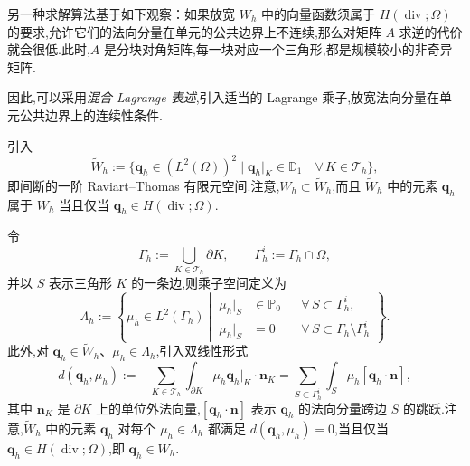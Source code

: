 另一种求解算法基于如下观察：如果放宽 \(W_h\) 中的向量函数须属于 \(H(\operatorname{div};\Omega)\) 的要求,允许它们的法向分量在单元的公共边界上不连续,那么对矩阵 \(A\) 求逆的代价就会很低.此时,\(A\) 是分块对角矩阵,每一块对应一个三角形,都是规模较小的非奇异矩阵.

因此,可以采用\emph{混合 Lagrange 表述},引入适当的 Lagrange 乘子,放宽法向分量在单元公共边界上的连续性条件.

\begin{example}\label{ex:7.3-discontinuous}
引入
\begin{equation}\label{eq:7.3.7}
  \widetilde W_h:=\{\boldsymbol{q}_h\in(L^2(\Omega))^2\mid
     \boldsymbol{q}_h|_K\in\mathbb D_1\quad\forall\,K\in\mathcal T_h\},
\end{equation}
即间断的一阶 Raviart--Thomas 有限元空间.注意,\(W_h\subset\widetilde W_h\),而且 \(\widetilde W_h\) 中的元素 \(\boldsymbol{q}_h\) 属于 \(W_h\) 当且仅当 \(\boldsymbol{q}_h\in H(\operatorname{div};\Omega)\).

令
\begin{equation}\label{eq:7.3.8}
  \Gamma_h:=\bigcup_{K\in\mathcal T_h}\partial K,\qquad
  \Gamma_h^i:=\Gamma_h\cap\Omega,
\end{equation}
并以 \(S\) 表示三角形 \(K\) 的一条边,则乘子空间定义为
\begin{equation}\label{eq:7.3.9}
  \Lambda_h:=\left\{\mu_h\in L^2(\Gamma_h)\ \left|\
    \begin{aligned}
      \mu_h|_S&\in\mathbb P_0&&\forall\,S\subset\Gamma_h^i,\\
      \mu_h|_S&=0&&\forall\,S\subset\Gamma_h\setminus\Gamma_h^i
    \end{aligned}
  \right.\right\}.
\end{equation}
此外,对 \(\boldsymbol{q}_h\in\widetilde W_h\)、\(\mu_h\in\Lambda_h\),引入双线性形式
\begin{equation}\label{eq:7.3.10}
  d(\boldsymbol{q}_h,\mu_h):=-\sum_{K\in\mathcal T_h}\int_{\partial K}\mu_h\boldsymbol{q}_h|_K\cdot\boldsymbol{n}_K
     =\sum_{S\subset\Gamma_h^i}\int_S\mu_h[\boldsymbol{q}_h\cdot\boldsymbol{n}],
\end{equation}
其中 \(\boldsymbol{n}_K\) 是 \(\partial K\) 上的单位外法向量,\([\boldsymbol{q}_h\cdot\boldsymbol{n}]\) 表示 \(\boldsymbol{q}_h\) 的法向分量跨边 \(S\) 的跳跃.注意,\(\widetilde W_h\) 中的元素 \(\boldsymbol{q}_h\) 对每个 \(\mu_h\in\Lambda_h\) 都满足 \(d(\boldsymbol{q}_h,\mu_h)=0\),当且仅当 \(\boldsymbol{q}_h\in H(\operatorname{div};\Omega)\),即 \(\boldsymbol{q}_h\in W_h\).


\end{example}
